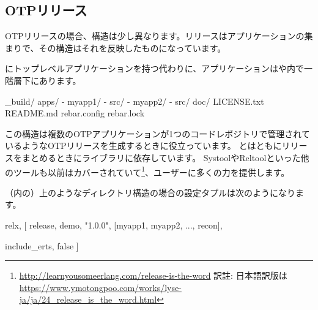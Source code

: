 \subsection{OTPリリース}
\label{subsec:building-otp-releases}

OTPリリースの場合、構造は少し異なります。リリースはアプリケーションの集まりで、その構造はそれを反映したものになっています。

にトップレベルアプリケーションを持つ代わりに、アプリケーションはや内で一階層下にあります。

\begin{VerbatimRaw}
_build/
apps/
  - myapp1/
     - src/
  - myapp2/
     - src/
doc/
LICENSE.txt
README.md
rebar.config
rebar.lock
\end{VerbatimRaw}

この構造は複数のOTPアプリケーションが1つのコードレポジトリで管理されているようなOTPリリースを生成するときに役立っています。
とはともにリリースをまとめるときにライブラリに依存しています。
SystoolやReltoolといった他のツールも以前はカバーされていて\footnote{\href{http://learnyousomeerlang.com/release-is-the-word}{http://learnyousomeerlang.com/release-is-the-word} 訳註: 日本語訳版は \href{https://www.ymotongpoo.com/works/lyse-ja/ja/24\_release\_is\_the\_word.html}{https://www.ymotongpoo.com/works/lyse-ja/ja/24\_release\_is\_the\_word.html}}、ユーザーに多くの力を提供します。

（内の）上のようなディレクトリ構造の場合の設定タプルは次のようになります。

\begin{VerbatimText}
{relx, [
  {release, {demo, "1.0.0"},
    [myapp1, myapp2, ..., recon]},
     
  {include_erts, false} %
]}
\end{VerbatimText}

